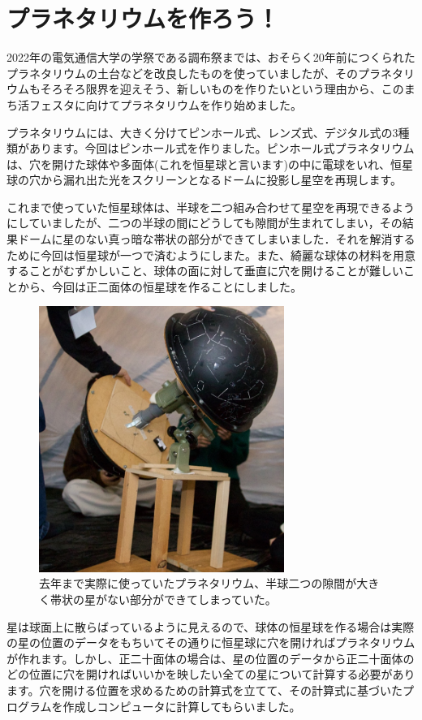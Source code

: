 \documentclass[supernova_2023]{subfiles}
\begin{document}
\chapter{プラネタリウムを作ろう！}

2022年の電気通信大学の学祭である調布祭までは、おそらく20年前につくられたプラネタリウムの土台などを改良したものを使っていましたが、そのプラネタリウムもそろそろ限界を迎えそう、新しいものを作りたいという理由から、このまち活フェスタに向けてプラネタリウムを作り始めました。

プラネタリウムには、大きく分けてピンホール式、レンズ式、デジタル式の3種類があります。今回はピンホール式を作りました。ピンホール式プラネタリウムは、穴を開けた球体や多面体(これを恒星球と言います)の中に電球をいれ、恒星球の穴から漏れ出た光をスクリーンとなるドームに投影し星空を再現します。

これまで使っていた恒星球体は、半球を二つ組み合わせて星空を再現できるようにしていましたが、二つの半球の間にどうしても隙間が生まれてしまい，その結果ドームに星のない真っ暗な帯状の部分ができてしまいました．それを解消するために今回は恒星球が一つで済むようにしまた。また、綺麗な球体の材料を用意することがむずかしいこと、球体の面に対して垂直に穴を開けることが難しいことから、今回は正二面体の恒星球を作ることにしました。

\begin{figure}[H]
  \centering
  \includegraphics[width=8cm]{figures/Nakahara/fig1.png}
  \caption{{\footnotesize 去年まで実際に使っていたプラネタリウム、半球二つの隙間が大きく帯状の星がない部分ができてしまっていた。}}
  \label{fig:1}
\end{figure}

星は球面上に散らばっているように見えるので、球体の恒星球を作る場合は実際の星の位置のデータをもちいてその通りに恒星球に穴を開ければプラネタリウムが作れます。しかし、正二十面体の場合は、星の位置のデータから正二十面体のどの位置に穴を開ければいいかを映したい全ての星について計算する必要があります。穴を開ける位置を求めるための計算式を立てて、その計算式に基づいたプログラムを作成しコンピュータに計算してもらいました。
\end{document}
